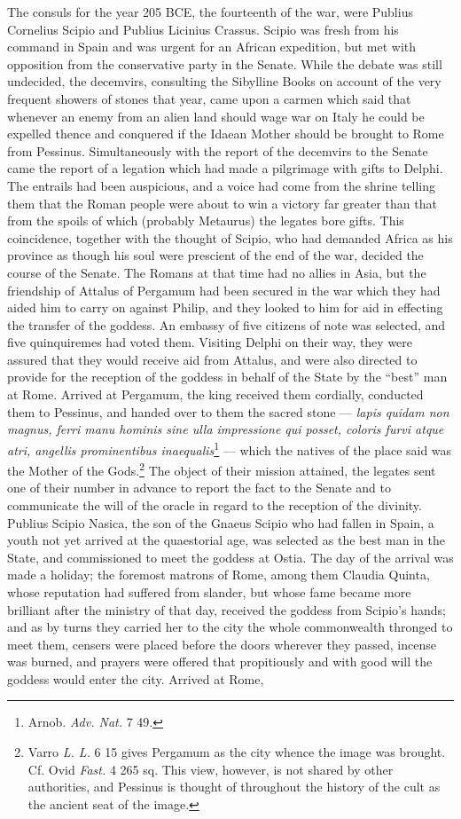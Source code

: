 \documentclass[a4paper, 11pt, oneside, polutonikogreek, french]{article}
\begin{document}
The consuls for the year 205 \textsc{BCE}, the fourteenth of the war, were Publius Cornelius Scipio and Publius Licinius Crassus. Scipio was fresh from his command in Spain and was urgent for an African expedition, but met with opposition from the conservative party in the Senate. While the debate was still undecided, the decemvirs, consulting the Sibylline Books on account of the very frequent showers of stones that year, came upon a carmen which said that whenever an enemy from an alien land should wage war on Italy he could be expelled thence and conquered if the Idaean Mother should be brought to Rome from Pessinus. Simultaneously with the report of the decemvirs to the Senate came the report of a legation which had made a pilgrimage with gifts to Delphi. The entrails had been auspicious, and a voice had come from the shrine telling them that the Roman people were about to win a victory far greater than that from the spoils of which (probably Metaurus) the legates bore gifts. This coincidence, together with the thought of Scipio, who had demanded Africa as his province as though his soul were prescient of the end of the war, decided the course of the Senate. The Romans at that time had no allies in Asia, but the friendship of Attalus of Pergamum had been secured in the war which they had aided him to carry on against Philip, and they looked to him for aid in effecting the transfer of the goddess. An embassy of five citizens of note was selected, and five quinquiremes had voted them. Visiting Delphi on their way, they were assured that they would receive aid from Attalus, and were also directed to provide for the reception of the goddess in behalf of the State by the ``best'' man at Rome. Arrived at Pergamum, the king received them cordially, conducted them to Pessinus, and handed over to them the sacred stone --- \emph{lapis quidam non magnus, ferri manu hominis sine ulla impressione qui posset, coloris furvi atque atri, angellis prominentibus inaequalis}\footnote{Arnob. \emph{Adv. Nat.} 7 49.} --- which the natives of the place said was the Mother of the Gods.\footnote{Varro \emph{L. L.} 6 15 gives Pergamum as the city whence the image was brought. Cf. Ovid \emph{Fast.} 4 265 sq. This view, however, is not shared by other authorities, and Pessinus is thought of throughout the history of the cult as the ancient seat of the image.} The object of their mission attained, the legates sent one of their number in advance to report the fact to the Senate and to communicate the will of the oracle in regard to the reception of the divinity. Publius Scipio Nasica, the son of the Gnaeus Scipio who had fallen in Spain, a youth not yet arrived at the quaestorial age, was selected as the best man in the State, and commissioned to meet the goddess at Ostia. The day of the arrival was made a holiday; the foremost matrons of Rome, among them Claudia Quinta, whose reputation had suffered from slander, but whose fame became more brilliant after the ministry of that day, received the goddess from Scipio's hands; and as by turns they carried her to the city the whole commonwealth thronged to meet them, censers were placed before the doors wherever they passed, incense was burned, and prayers were offered that propitiously and with good will the goddess would enter the city. Arrived at Rome, 
\end{document}
